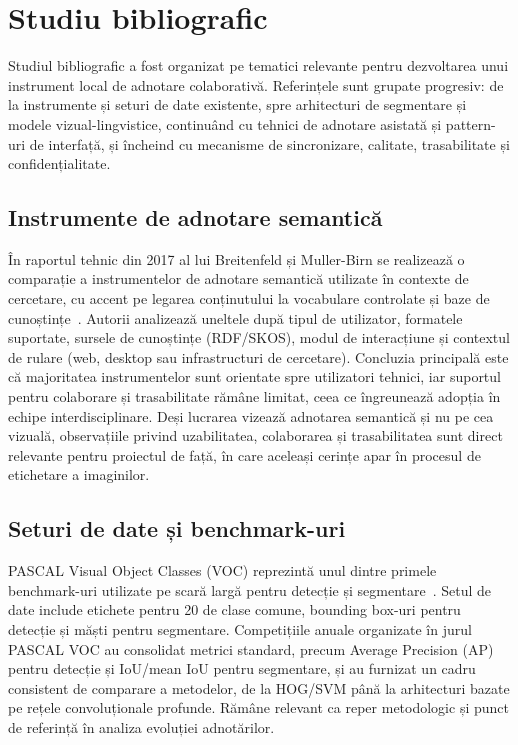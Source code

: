 \chapter{Studiu bibliografic}\label{ch:studiubib}

\pagestyle{fancy}

Studiul bibliografic a fost organizat pe tematici relevante pentru dezvoltarea unui instrument local de adnotare colaborativă. Referințele sunt grupate progresiv: de la instrumente și seturi de date existente, spre arhitecturi de segmentare și modele vizual-lingvistice, continuând cu tehnici de adnotare asistată și pattern-uri de interfață, și încheind cu mecanisme de sincronizare, calitate, trasabilitate și confidențialitate.

\section{Instrumente de adnotare semantică}

În raportul tehnic din 2017 al lui Breitenfeld și Muller-Birn se realizează o comparație a instrumentelor de adnotare semantică utilizate în contexte de cercetare, cu accent pe legarea conținutului la vocabulare controlate și baze de cunoștințe~\cite{Breitenfeld2017}. Autorii analizează uneltele după tipul de utilizator, formatele suportate, sursele de cunoștințe (RDF/SKOS), modul de interacțiune și contextul de rulare (web, desktop sau infrastructuri de cercetare). Concluzia principală este că majoritatea instrumentelor sunt orientate spre utilizatori tehnici, iar suportul pentru colaborare și trasabilitate rămâne limitat, ceea ce îngreunează adopția în echipe interdisciplinare. Deși lucrarea vizează adnotarea semantică și nu pe cea vizuală, observațiile privind uzabilitatea, colaborarea și trasabilitatea sunt direct relevante pentru proiectul de față, în care aceleași cerințe apar în procesul de etichetare a imaginilor.

\section{Seturi de date și benchmark-uri}

PASCAL Visual Object Classes (VOC) reprezintă unul dintre primele benchmark-uri utilizate pe scară largă pentru detecție și segmentare~\cite{10.1007/s11263-009-0275-4}. Setul de date include etichete pentru 20 de clase comune, bounding box-uri pentru detecție și măști pentru segmentare. Competițiile anuale organizate în jurul PASCAL VOC au consolidat metrici standard, precum Average Precision (AP) pentru detecție și IoU/mean IoU pentru segmentare, și au furnizat un cadru consistent de comparare a metodelor, de la HOG/SVM până la arhitecturi bazate pe rețele convoluționale profunde. Rămâne relevant ca reper metodologic și punct de referință în analiza evoluției adnotărilor.

